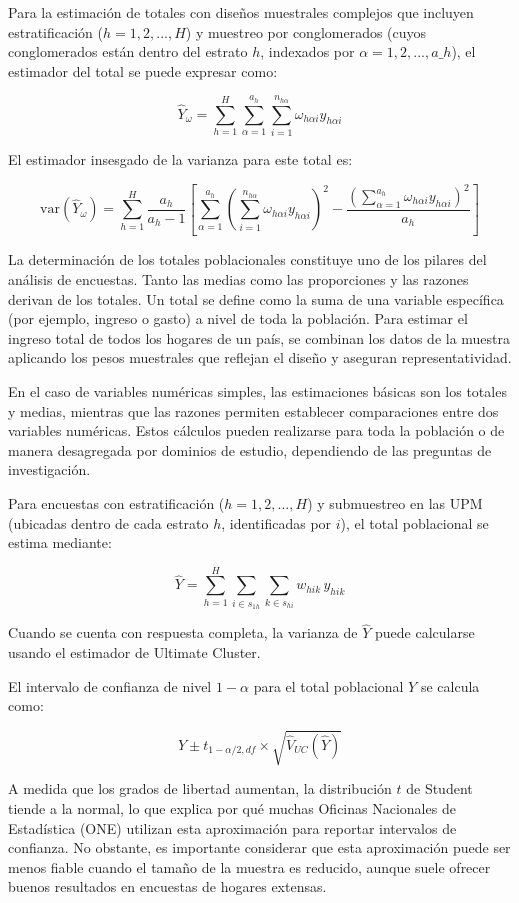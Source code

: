 \documentclass[
  12pt,
]{book}
\begin{document}
Para la estimación de totales con diseños muestrales complejos que incluyen estratificación (\(h=1,2,...,H\)) y muestreo por conglomerados (cuyos conglomerados están dentro del estrato \(h\), indexados por \(\alpha=1,2,...,a\_h\)), el estimador del total se puede expresar como:

\[
\hat{Y}_{\omega} = \sum_{h=1}^{H}\sum_{\alpha=1}^{a_h}\sum_{i=1}^{n_{h\alpha}}\omega_{h\alpha i} y_{h\alpha i}
\]

El estimador insesgado de la varianza para este total es:

\[
\text{var}\left(\hat{Y}_{\omega}\right) = \sum_{h=1}^{H} \frac{a_h}{a_h - 1} \left[ \sum_{\alpha=1}^{a_h} \left( \sum_{i=1}^{n_{h\alpha}} \omega_{h\alpha i} y_{h\alpha i} \right)^2 - \frac{\left( \sum_{\alpha=1}^{a_h} \omega_{h\alpha i} y_{h\alpha i} \right)^2}{a_h} \right]
\]

La determinación de los totales poblacionales constituye uno de los pilares del análisis de encuestas. Tanto las medias como las proporciones y las razones derivan de los totales. Un total se define como la suma de una variable específica (por ejemplo, ingreso o gasto) a nivel de toda la población. Para estimar el ingreso total de todos los hogares de un país, se combinan los datos de la muestra aplicando los pesos muestrales que reflejan el diseño y aseguran representatividad.

En el caso de variables numéricas simples, las estimaciones básicas son los totales y medias, mientras que las razones permiten establecer comparaciones entre dos variables numéricas. Estos cálculos pueden realizarse para toda la población o de manera desagregada por dominios de estudio, dependiendo de las preguntas de investigación.

Para encuestas con estratificación (\(h=1,2,...,H\)) y submuestreo en las UPM (ubicadas dentro de cada estrato \(h\), identificadas por \(i\)), el total poblacional se estima mediante:

\[
\hat{Y} = \sum_{h=1}^{H} \sum_{i \in s_{1h}} \sum_{k \in s_{hi}} w_{hik} \, y_{hik}
\]

Cuando se cuenta con respuesta completa, la varianza de \(\hat{Y}\) puede calcularse usando el estimador de Ultimate Cluster.

El intervalo de confianza de nivel \(1-\alpha\) para el total poblacional \(Y\) se calcula como:

\[
\hat{Y} \pm t_{1-\alpha/2, df} \times \sqrt{\hat{V}_{UC}(\hat{Y})}
\]

A medida que los grados de libertad aumentan, la distribución \(t\) de Student tiende a la normal, lo que explica por qué muchas Oficinas Nacionales de Estadística (ONE) utilizan esta aproximación para reportar intervalos de confianza. No obstante, es importante considerar que esta aproximación puede ser menos fiable cuando el tamaño de la muestra es reducido, aunque suele ofrecer buenos resultados en encuestas de hogares extensas.
\end{document}
